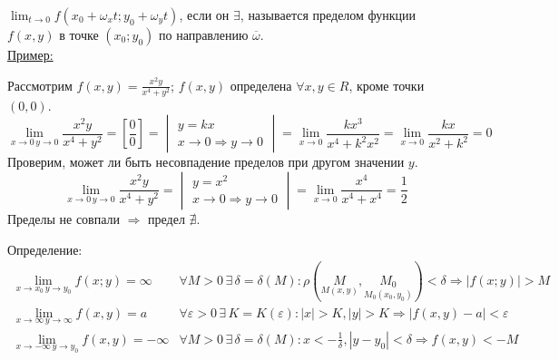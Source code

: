 \documentclass[12pt]{article}
\begin{document}
    $\lim_{t \to 0} f(x_0+\omega_xt; y_0+\omega_yt)$, если он $\exists$, называется пределом функции $f(x, y)$ в точке $(x_0; y_0)$ по направлению $\overline{\omega}$.\\
    \underline{Пример:}
    \begin{adjustwidth}{1.5em}{1.5em}
        Рассмотрим $f(x,y) = \frac{x^2y}{x^4 + y^2}$; $f(x,y)$ определена $\forall x, y \in R$, кроме точки $(0, 0)$.
        \[ \lim_{x \to 0\,y \to 0} \frac{x^2y}{x^4 + y^2} = \left[ \frac{0}{0} \right] = \begin{vmatrix}
            y = kx\\
            x \to 0 \Rightarrow y \to 0
        \end{vmatrix} = \lim_{x\to 0} \frac{kx^3}{x^4+k^2x^2} = \lim_{x \to 0}\frac{kx}{x^2+k^2} = 0 \]
        Проверим, может ли быть несовпадение пределов при другом значении $y$.
        \[ \lim_{x \to 0\,y \to 0} \frac{x^2y}{x^4 + y^2} = \begin{vmatrix}
            y = x^2\\
            x \to 0 \Rightarrow y \to 0
        \end{vmatrix} = \lim_{x \to 0}\frac{x^4}{x^4+x^4} = \frac{1}{2} \]
        Пределы не совпали $\Rightarrow$ предел $\nexists$.
    \end{adjustwidth}
    Определение:
    \[\begin{matrix}
        \lim_{x \to x_0\, y \to y_0}f(x;y)=\infty & \forall M > 0\, \exists\, \delta = \delta(M): \rho(\underset{M(x,y)}{M}, \underset{M_0(x_0, y_0)}{M_0}) < \delta \Rightarrow |f(x;y)| > M\\
        \lim_{x\to\infty\, y\to\infty}f(x,y) = a & \forall \varepsilon > 0\, \exists\, K = K(\varepsilon): |x| > K, |y| > K \Rightarrow |f(x,y) - a| < \varepsilon\\
        \lim_{x\to-\infty\, y\to y_0}f(x,y) = -\infty & \forall M > 0\, \exists\, \delta = \delta(M): x < -\frac{1}{\delta}, |y-y_0|<\delta \Rightarrow f(x,y) < -M
    \end{matrix}\]
\end{document}
